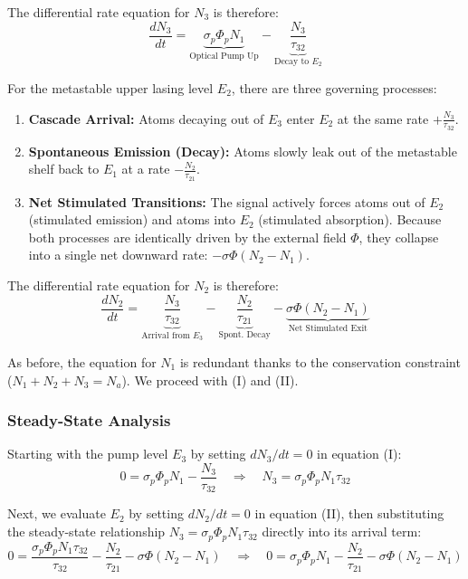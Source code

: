 The differential rate equation for $N_3$ is therefore:
\begin{equation}
    \frac{dN_3}{dt} = \underbrace{\sigma_p\Phi_p N_1}_{\text{Optical Pump Up}} - \underbrace{\frac{N_3}{\tau_{32}}}_{\text{Decay to } E_2} \tag{I}
\end{equation}

For the metastable upper lasing level $E_2$, there are three governing processes:
\begin{enumerate}
    \item \textbf{Cascade Arrival:} Atoms decaying out of $E_3$ enter $E_2$ at the same rate $+\frac{N_3}{\tau_{32}}$.
    \item \textbf{Spontaneous Emission (Decay):} Atoms slowly leak out of the metastable shelf back to $E_1$ at a rate $-\frac{N_2}{\tau_{21}}$.
    \item \textbf{Net Stimulated Transitions:} The signal actively forces atoms out of $E_2$ (stimulated emission) and atoms into $E_2$ (stimulated absorption). Because both processes are identically driven by the external field $\Phi$, they collapse into a single net downward rate: $-\sigma\Phi(N_2 - N_1)$.
\end{enumerate}

The differential rate equation for $N_2$ is therefore:
\begin{equation}
    \frac{dN_2}{dt} = \underbrace{\frac{N_3}{\tau_{32}}}_{\text{Arrival from } E_3} - \underbrace{\frac{N_2}{\tau_{21}}}_{\text{Spont. Decay}} - \underbrace{\sigma\Phi(N_2 - N_1)}_{\text{Net Stimulated Exit}} \tag{II}
\end{equation}

As before, the equation for $N_1$ is redundant thanks to the conservation constraint ($N_1 + N_2 + N_3 = N_a$). We proceed with \textup{(I)} and \textup{(II)}.

\subsubsection*{Steady-State Analysis}

Starting with the pump level $E_3$ by setting $dN_3/dt = 0$ in equation \textup{(I)}:
\begin{equation*}
    0 = \sigma_p\Phi_p N_1 - \frac{N_3}{\tau_{32}} \quad \Longrightarrow \quad N_3 = \sigma_p\Phi_p N_1 \tau_{32}
\end{equation*}

Next, we evaluate $E_2$ by setting $dN_2/dt = 0$ in equation \textup{(II)}, then substituting the steady-state relationship $N_3 = \sigma_p\Phi_p N_1\tau_{32}$ directly into its arrival term:
\begin{equation*}
    0 = \frac{\sigma_p\Phi_p N_1 \tau_{32}}{\tau_{32}} - \frac{N_2}{\tau_{21}} - \sigma\Phi(N_2 - N_1) \quad \Longrightarrow \quad 0 = \sigma_p\Phi_p N_1 - \frac{N_2}{\tau_{21}} - \sigma\Phi(N_2 - N_1)
\end{equation*}

